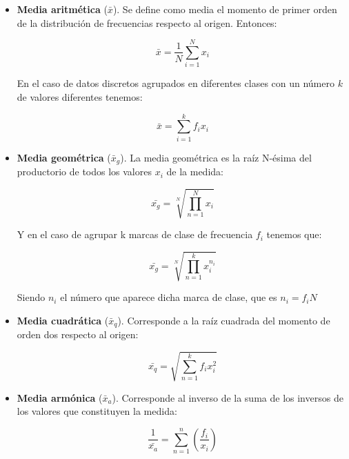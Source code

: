 \documentclass[12pt,a4paper]{book}
\newcommand{\Par}[1]{\left( #1 \right)}
\begin{document}
\begin{itemize}
\item \textbf{Media aritmética} ($\bar{x}$). Se define como media el momento de primer orden de la distribución de frecuencias respecto al origen. Entonces:

\begin{equation}
\bar{x} = \dfrac{1}{N} \sum_{i=1}^N x_i
\end{equation}

En el caso de datos discretos agrupados en diferentes clases con un número $k$ de valores diferentes tenemos:

\begin{equation}
\bar{x} = \sum_{i=1}^k f_i x_i
\end{equation}


\item \textbf{Media geométrica} ($\bar{x}_g$). La media geométrica es la raíz N-ésima del productorio de todos los valores $x_i$ de la medida: 

\begin{equation}
\bar{x_g} = \sqrt[N]{\prod_{n=1}^N x_i}
\end{equation}

Y en el caso de agrupar k marcas de clase de frecuencia $f_i$ tenemos que:

\begin{equation}
\bar{x_g} = \sqrt[N]{\prod_{n=1}^k x_i^{n_i}}
\end{equation}

Siendo $n_i$ el número que aparece dicha marca de clase, que es $n_i = f_i N$ \\


\item \textbf{Media cuadrática} ($\bar{x}_q$). Corresponde a la raíz cuadrada del momento de orden dos respecto al origen:

\begin{equation}
\bar{x_q} = \sqrt{\sum_{n=1}^k f_i x^2_i}
\end{equation}


\item \textbf{Media armónica} ($\bar{x}_a$). Corresponde al inverso de la suma de los inversos de los valores que constituyen la medida: 

\begin{equation}
\dfrac{1}{\bar{x_a}} = \sum_{n=1}^n \Par{\dfrac{f_i}{x_i}}
\end{equation}


\end{itemize}
\end{document}
